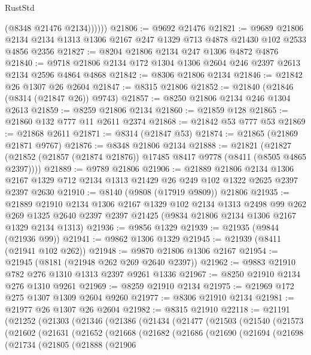 \begin{lexlean}{RustStd}
\begin{coremodule}
              (@8348 @21476 @2134))))))
@21806 := @9692 @21476
@21821 := @9689
    @21806
    @2134
    @2134
    @1313
    @1306
    @2167
    @247
    @1329
    @713
    @4878
    @21430
    @102
    @2533
    @4856
    @2356
@21827 := @8204 @21806 @2134 @247 @1306 @4872 @4876
@21840 := @9718 @21806 @2134 @172 @1304 @1306 @2604 @246 @2397 @2613 @2134 @2596 @4864 @4868
@21842 := @8306 @21806 @2134
@21846 := @21842 @26 @1307 @26 @2604
@21847 := @8315 @21806
@21852 := @21840 (@21846 (@8314 (@21847 @26)) @9743)
@21857 := @8250 @21806 @2134 @246 @1304 @2613
@21859 := @8259 @21806 @2134
@21860 := @21859 @128
@21865 := @21860 @132 @777 @11 @2611 @2374
@21868 := @21842 @53 @777 @53
@21869 := @21868 @2611
@21871 := @8314 (@21847 @53)
@21874 := @21865 (@21869 @21871 @9767)
@21876 := @8348 @21806 @2134
@21888 := @21821
    (@21827 (@21852 (@21857 (@21874 @21876)) @17485 @8417 @9778 (@8411 (@8505 @4865 @2397))))
@21889 := @9789 @21806
@21906 := @21889
    @21806
    @2134
    @1306
    @2167
    @1329
    @712
    @2134
    @1313
    @21429
    @26
    @249
    @102
    @1322
    @2625
    @2397
    @2397
    @2630
@21910 := @8140 (@9808 (@17919 @9809)) @21806
@21935 := @21889
    @21910
    @2134
    @1306
    @2167
    @1329
    @102
    @2134
    @1313
    @2498
    @99
    @262
    @269
    @1325
    @2640
    @2397
    @2397
    @21425
    (@9834 @21806 @2134 @1306 @2167 @1329 @2134 @1313)
@21936 := @9856 @1329
@21939 := @21935 (@9844 (@21936 @99))
@21941 := @9862 @1306 @1329
@21945 := @21939 (@8411 (@21941 @102 @262))
@21948 := @9870 @21806 @1306 @2167
@21954 := @21945 (@8181 (@21948 @262 @269 @2640 @2397))
@21962 := @9883 @21910 @782 @276 @1310 @1313 @2397 @9261 @1336
@21967 := @8250 @21910 @2134 @276 @1310 @9261
@21969 := @8259 @21910 @2134
@21975 := @21969 @172 @275 @1307 @1309 @2604 @9260
@21977 := @8306 @21910 @2134
@21981 := @21977 @26 @1307 @26 @2604
@21982 := @8315 @21910
@22118 := @21191
    (@21252
      (@21303
        (@21346
          (@21386
            (@21434
              (@21477
                (@21503
                  (@21540
                    (@21573
                      (@21602
                        (@21631
                          (@21652
                            (@21668
                              (@21682
                                (@21686
                                  (@21690
                                    (@21694
                                      (@21698
                                        (@21734
                                          (@21805
                                            (@21888
                                              (@21906

\end{coremodule}
\end{lexlean}
